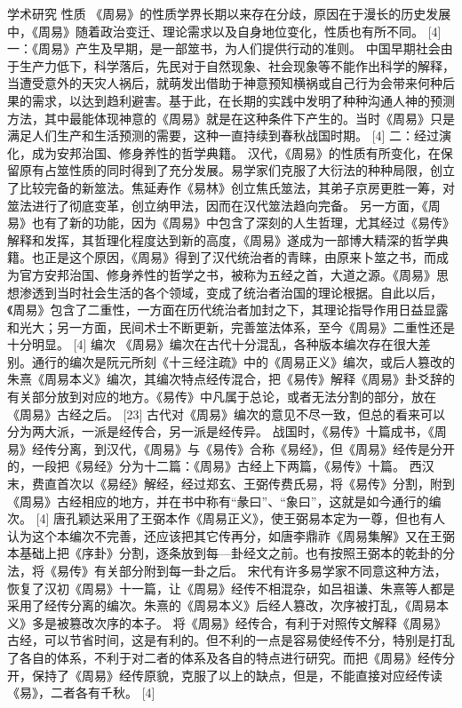 \documentclass[12pt,UTF8]{ctexbook}
\begin{document}
学术研究
性质
《周易》的性质学界长期以来存在分歧，原因在于漫长的历史发展中，《周易》随着政治变迁、理论需求以及自身地位变化，性质也有所不同。 [4]
一：《周易》产生及早期，是一部筮书，为人们提供行动的准则。
中国早期社会由于生产力低下，科学落后，先民对于自然现象、社会现象等不能作出科学的解释，当遭受意外的天灾人祸后，就萌发出借助于神意预知横祸或自己行为会带来何种后果的需求，以达到趋利避害。基于此，在长期的实践中发明了种种沟通人神的预测方法，其中最能体现神意的《周易》就是在这种条件下产生的。当时《周易》只是满足人们生产和生活预测的需要，这种一直持续到春秋战国时期。 [4]
二：经过演化，成为安邦治国、修身养性的哲学典籍。
汉代，《周易》的性质有所变化，在保留原有占筮性质的同时得到了充分发展。易学家们克服了大衍法的种种局限，创立了比较完备的新筮法。焦延寿作《易林》创立焦氏筮法，其弟子京房更胜一筹，对筮法进行了彻底变革，创立纳甲法，因而在汉代筮法趋向完备。
另一方面，《周易》也有了新的功能，因为《周易》中包含了深刻的人生哲理，尤其经过《易传》解释和发挥，其哲理化程度达到新的高度，《周易》遂成为一部博大精深的哲学典籍。也正是这个原因，《周易》得到了汉代统治者的青睐，由原来卜筮之书，而成为官方安邦治国、修身养性的哲学之书，被称为五经之首，大道之源。《周易》思想渗透到当时社会生活的各个领域，变成了统治者治国的理论根据。自此以后，《周易》包含了二重性，一方面在历代统治者加封之下，其理论指导作用日益显露和光大；另一方面，民间术士不断更新，完善筮法体系，至今《周易》二重性还是十分明显。 [4]
编次
《周易》编次在古代十分混乱，各种版本编次存在很大差别。通行的编次是阮元所刻《十三经注疏》中的《周易正义》编次，或后人篡改的朱熹《周易本义》编次，其编次特点经传混合，把《易传》解释《周易》卦爻辞的有关部分放到对应的地方。《易传》中凡属于总论，或者无法分割的部分，放在《周易》古经之后。 [23]
古代对《周易》编次的意见不尽一致，但总的看来可以分为两大派，一派是经传合，另一派是经传异。
战国时，《易传》十篇成书，《周易》经传分离，到汉代，《周易》与《易传》合称《易经》，但《周易》经传是分开的，一段把《易经》分为十二篇：《周易》古经上下两篇，《易传》十篇。
西汉末，费直首次以《易经》解经，经过郑玄、王弼传费氏易，将《易传》分割，附到《周易》古经相应的地方，并在书中称有“彖曰”、“象曰”，这就是如今通行的编次。 [4]
唐孔颖达采用了王弼本作《周易正义》，使王弼易本定为一尊，但也有人认为这个本编次不完善，还应该把其它传再分，如唐李鼎祚《周易集解》又在王弼本基础上把《序卦》分割，逐条放到每—卦经文之前。也有按照王弼本的乾卦的分法，将《易传》有关部分附到每一卦之后。
宋代有许多易学家不同意这种方法，恢复了汉初《周易》十一篇，让《周易》经传不相混杂，如吕祖谦、朱熹等人都是采用了经传分离的编次。朱熹的《周易本义》后经人篡改，次序被打乱，《周易本义》多是被篡改次序的本子。
将《周易》经传合，有利于对照传文解释《周易》古经，可以节省时间，这是有利的。但不利的一点是容易使经传不分，特别是打乱了各自的体系，不利于对二者的体系及各自的特点进行研究。而把《周易》经传分开，保持了《周易》经传原貌，克服了以上的缺点，但是，不能直接对应经传读《易》，二者各有千秋。 [4]
\end{document}
